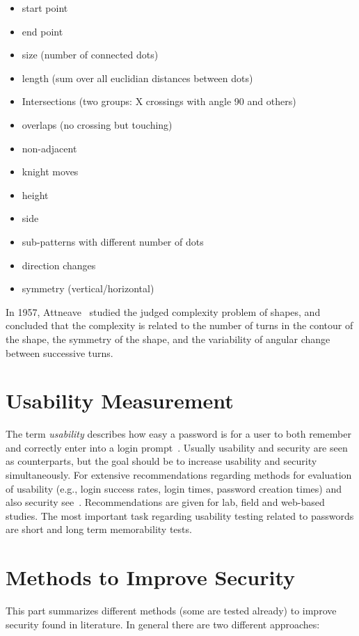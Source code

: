 \documentclass[twocolumn, a4paper, 10pt]{article}
\begin{document}
\begin{itemize}
	\item start point
	\item end point
	\item size (number of connected dots)
	\item length (sum over all euclidian distances between dots)
	\item Intersections (two groups: X crossings with angle 90 and others)
	\item overlaps (no crossing but touching)
	\item non-adjacent
	\item knight moves
	\item height
	\item side
	\item sub-patterns with different number of dots
	\item direction changes
	\item symmetry (vertical/horizontal)
\end{itemize}

In 1957, Attneave~\cite{attneave1957physical} studied the judged complexity problem of shapes, and concluded that the complexity is related to the number of turns in the contour of the shape, the symmetry of the shape, and the variability of angular change between successive turns.


\section{Usability Measurement}
\label{sec:usability}

The term \emph{usability} describes how easy a password is for a user to both remember and correctly enter into a login prompt~\cite{Keith200717}. Usually usability and security are seen as counterparts, but the goal should be to increase usability and security simultaneously. For extensive recommendations regarding methods for evaluation of usability (e.g., login success rates, login times, password creation times) and also security see~\cite{Biddle:2012:GPL:2333112.2333114}. Recommendations are given for lab, field and web-based studies. The most important task regarding usability testing related to passwords are short and long term memorability tests.

\section {Methods to Improve Security}
\label{sec:improve}
This part summarizes different methods (some are tested already) to improve security found in literature. In general there are two different approaches:
\end{document}
